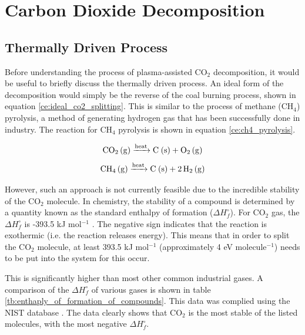 \chapter{Carbon Dioxide Decomposition}

\section{Thermally Driven Process}

Before understanding the process of plasma-assisted CO$_2$ decomposition, it would be useful to briefly discuss the thermally driven process. An ideal form of the decomposition would simply be the reverse of the coal burning process, shown in equation \ref{ce:ideal_co2_splitting}. This is similar to the process of methane (CH$_4$) pyrolysis, a method of generating hydrogen gas that has been successfully done in industry. The reaction for CH$_4$ pyrolysis is shown in equation \ref{ce:ch4_pyrolysis}.

\begin{equation}
    \ce{CO_2 (g) ->[heat] C (s) + O_2 (g)}
    \label{ce:ideal_co2_splitting}
\end{equation}
\vspace{-20px}
\begin{equation}
    \ce{CH_4 (g) ->[heat] C (s) + 2H_2 (g)}
    \label{ce:ch4_pyrolysis}
\end{equation}

However, such an approach is not currently feasible due to the incredible stability of the CO$_2$ molecule. In chemistry, the stability of a compound is determined by a quantity known as the standard enthalpy of formation ($\Delta H^\circ_f$). For CO$_2$ gas, the $\Delta H^\circ_f $ is -393.5 kJ mol$^{-1}$ \cite{Chase1998, NIST_Chemistry_WebBook}. The negative sign indicates that the reaction is exothermic (i.e. the reaction releases energy). This means that in order to split the CO$_2$ molecule, at least 393.5 kJ mol$^{-1}$ (approximately 4 eV molecule$^{-1}$) needs to be put into the system for this occur. 

This is significantly higher than most other common industrial gases. A comparison of the $\Delta H^\circ_f$ of various gases is shown in table \ref{tb:enthaply_of_formation_of_compounds}. This data was complied using the NIST database \cite{NIST_Chemistry_WebBook}. The data clearly shows that CO$_2$ is the most stable of the listed molecules, with the most negative $\Delta H^\circ_f$.

